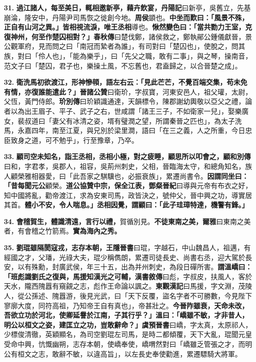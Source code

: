 \textbf{31.} \textbf{過江諸人，每至美日，輒相邀新亭，藉卉飲宴，}{\footnotesize \textbf{丹陽記}曰新亭，吳舊立，先基崩淪，隆安中，丹陽尹司馬恢之徙創今地。}\textbf{周侯}{\footnotesize 顗也。}\textbf{中坐而歎曰：「風景不殊，正自有山河之異。」皆相視流淚，唯王丞相}{\footnotesize 導也。}\textbf{愀然變色曰：「當共勠力王室，克復神州，何至作楚囚相對？」}{\footnotesize \textbf{春秋傳}曰楚伐鄭，諸侯救之，鄭執鄖公鍾儀獻晉，景公觀軍府，見而問之曰「南冠而縶者為誰」，有司對曰「楚囚也」，使脫之，問其族，對曰「伶人也」，「能為樂乎」，曰「先父之職，敢有二事」，與之琴，操南音，范文子曰「楚囚，君子也，樂操土風，不忘舊也，君盍歸之，以合晉楚之成」。}

\textbf{32.} \textbf{衛洗馬初欲渡江，形神慘顇，語左右云：「見此芒芒，不覺百端交集，苟未免有情，亦復誰能遣此？」}{\footnotesize \textbf{晉諸公贊}曰衛玠，字叔寶，河東安邑人，祖父瓘，太尉，父恆，黃門侍郎。\textbf{玠別傳}曰玠穎識通達，天韻標令，陳郡謝幼輿敬以亞父之禮，論者以為出王眉子、平子、武子之右，世咸謂「諸王三子，不如衛家一兒」，娶樂廣女，裴叔道曰「妻父有冰清之姿，壻有璧潤之望，所謂秦晉之匹也」，為太子洗馬，永嘉四年，南至江夏，與兄別於梁里澗，語曰「在三之義，人之所重，今日忠臣致身之道，可不勉乎」，行至豫章，乃卒。}

\textbf{33.} \textbf{顧司空未知名，詣王丞相，丞相小極，對之疲睡，顧思所以叩會之，}{\footnotesize \textbf{顧和別傳}曰和，字君孝，吳郡人，祖容，吳荊州刺史，父相，晉臨海太守，和總角知名，族人顧榮雅相器愛，曰「此吾家之騏驥也，必振衰族」，累遷尚書令。}\textbf{因謂同坐曰：「昔每聞元公}{\footnotesize 顧榮。}\textbf{道公協贊中宗，保全江表，}{\footnotesize \textbf{鄧粲晉紀}曰導與元帝有布衣之好，知中國將亂，勸帝渡江，求為安東司馬，政皆決之，號仲父，晉中興之功，導實居其首。}\textbf{體小不安，令人喘息。」丞相因覺，謂顧曰：「此子珪璋特達，機警有鋒。」}

\textbf{34.} \textbf{會稽賀生，體識清遠，言行以禮，}{\footnotesize 賀循別見。}\textbf{不徒東南之美，}{\footnotesize \textbf{爾雅}曰東南之美者，有會稽之竹箭焉。}\textbf{實為海內之秀。}

\textbf{35.} \textbf{劉琨雖隔閡寇戎，志存本朝，}{\footnotesize \textbf{王隱晉書}曰琨，字越石，中山魏昌人，祖邁，有經國之才，父璠，光祿大夫，琨少稱儁朗，累遷司徒長史、尚書右丞，迎大駕於長安，以有殊勳，封廣武侯，年三十五，出為并州刺史，為段日磾所害。}\textbf{謂溫嶠曰：「班彪識劉氏之復與，馬援知漢光之可輔，}{\footnotesize \textbf{漢書敘傳}曰彪，字叔皮，扶風人，客於天水，隴西隗囂有窺覦之志，彪作王命論以諷之。\textbf{東觀漢記}曰馬援，字文淵，茂陵人，從公孫述、隗囂游，後見光武，曰「天下反覆，盜名字者不可勝數，今見陛下寥廓大度，同符高祖，乃知帝王自有真也」，帝甚壯之。}\textbf{今晉阼雖衰，天命未改，吾欲立功於河北，使卿延譽於江南，子其行乎？」溫曰：「嶠雖不敏，才非昔人，明公以桓文之姿，建匡立之功，豈敢辭命？」}{\footnotesize \textbf{虞預晉書}曰嶠，字太真，太原祁人，少標俊清徹，英穎顯名，為司空劉琨左司馬，是時二都傾覆，天下大亂，琨聞元皇受命中興，忼慨幽朔，志存本朝，使嶠奉使，嶠喟然對曰「嶠雖乏管張之才，而明公有桓文之志，敢辭不敏，以違高旨」，以左長史奉使勸進，累遷驃騎大將軍。}

